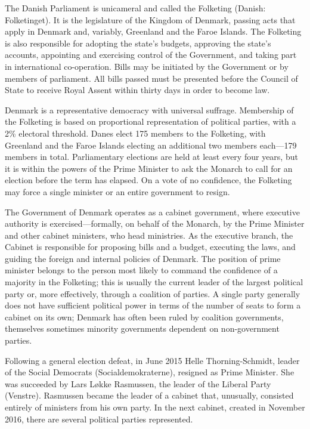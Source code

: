 The Danish Parliament is unicameral and called the Folketing (Danish:
Folketinget). It is the legislature of the Kingdom of Denmark, passing
acts that apply in Denmark and, variably, Greenland and the Faroe
Islands. The Folketing is also responsible for adopting the state's
budgets, approving the state's accounts, appointing and exercising
control of the Government, and taking part in international
co-operation. Bills may be initiated by the Government or by members of
parliament. All bills passed must be presented before the Council of
State to receive Royal Assent within thirty days in order to become law.

Denmark is a representative democracy with universal suffrage.
Membership of the Folketing is based on proportional representation of
political parties, with a 2\% electoral threshold. Danes elect 175
members to the Folketing, with Greenland and the Faroe Islands electing
an additional two members each---179 members in total. Parliamentary
elections are held at least every four years, but it is within the
powers of the Prime Minister to ask the Monarch to call for an election
before the term has elapsed. On a vote of no confidence, the Folketing
may force a single minister or an entire government to resign.

The Government of Denmark operates as a cabinet government, where
executive authority is exercised---formally, on behalf of the Monarch,
by the Prime Minister and other cabinet ministers, who head ministries.
As the executive branch, the Cabinet is responsible for proposing bills
and a budget, executing the laws, and guiding the foreign and internal
policies of Denmark. The position of prime minister belongs to the
person most likely to command the confidence of a majority in the
Folketing; this is usually the current leader of the largest political
party or, more effectively, through a coalition of parties. A single
party generally does not have sufficient political power in terms of the
number of seats to form a cabinet on its own; Denmark has often been
ruled by coalition governments, themselves sometimes minority
governments dependent on non-government parties.

Following a general election defeat, in June 2015 Helle
Thorning-Schmidt, leader of the Social Democrats (Socialdemokraterne),
resigned as Prime Minister. She was succeeded by Lars Løkke Rasmussen,
the leader of the Liberal Party (Venstre). Rasmussen became the leader
of a cabinet that, unusually, consisted entirely of ministers from his
own party. In the next cabinet, created in November 2016, there are
several political parties represented.

